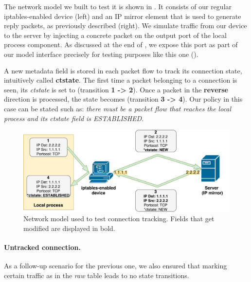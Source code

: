 The network model we built to test it is shown in
.  It consists of our regular
iptables-enabled device (left) and an IP mirror element that is used to
generate reply packets, as previously described (right).  We simulate traffic
from our device to the server by injecting a concrete packet on the output port
of the local process component.  As discussed at the end of
, we expose this port as part of our
model interface precisely for testing purposes like this one
().

A new metadata field is stored in each packet flow to track its connection
state, intuitively called \textbf{ctstate}.  The first time a packet belonging
to a connection is seen, its \emph{ctstate} is set to \NEW (transition
\textbf{1 -> 2}).  Once a packet in the \textbf{reverse} direction is
processed, the state becomes \ESTABLISHED (transition \textbf{3 -> 4}).  Our
policy in this case can be stated such as: \emph{there must be a packet flow
that reaches the local process and its ctstate field is ESTABLISHED}.

\begin{figure}[h]
  \centering
  \captionsetup{justification=centering}
  \includegraphics[scale=0.5]{assets/img/state-switch}
  \caption[Network model used to test connection tracking.]{Network model used
  to test connection tracking. Fields that get modified are displayed in bold.}
  \label{fig:state-switch}
\end{figure}

\paragraph{Untracked connection.}
As a follow-up scenario for the previous one, we also ensured that marking
certain traffic as \UNTRACKED in the \emph{raw} table leads to no state
transitions.

\bigskip

